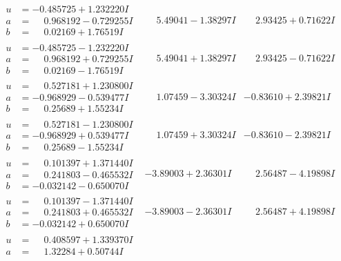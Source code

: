 \documentclass[1p]{elsarticle_modified}
\theoremstyle{definition}
\begin{document}
$$\begin{array}{c|c|c}
\begin{aligned}
u &= -0.485725 + 1.232220 I \\
a &= \phantom{-}0.968192 - 0.729255 I \\
b &= \phantom{-}0.02169 + 1.76519 I\end{aligned}
 & \phantom{-}5.49041 - 1.38297 I & \phantom{-}2.93425 + 0.71622 I \\ \hline\begin{aligned}
u &= -0.485725 - 1.232220 I \\
a &= \phantom{-}0.968192 + 0.729255 I \\
b &= \phantom{-}0.02169 - 1.76519 I\end{aligned}
 & \phantom{-}5.49041 + 1.38297 I & \phantom{-}2.93425 - 0.71622 I \\ \hline\begin{aligned}
u &= \phantom{-}0.527181 + 1.230800 I \\
a &= -0.968929 - 0.539477 I \\
b &= \phantom{-}0.25689 + 1.55234 I\end{aligned}
 & \phantom{-}1.07459 - 3.30324 I & -0.83610 + 2.39821 I \\ \hline\begin{aligned}
u &= \phantom{-}0.527181 - 1.230800 I \\
a &= -0.968929 + 0.539477 I \\
b &= \phantom{-}0.25689 - 1.55234 I\end{aligned}
 & \phantom{-}1.07459 + 3.30324 I & -0.83610 - 2.39821 I \\ \hline\begin{aligned}
u &= \phantom{-}0.101397 + 1.371440 I \\
a &= \phantom{-}0.241803 - 0.465532 I \\
b &= -0.032142 - 0.650070 I\end{aligned}
 & -3.89003 + 2.36301 I & \phantom{-}2.56487 - 4.19898 I \\ \hline\begin{aligned}
u &= \phantom{-}0.101397 - 1.371440 I \\
a &= \phantom{-}0.241803 + 0.465532 I \\
b &= -0.032142 + 0.650070 I\end{aligned}
 & -3.89003 - 2.36301 I & \phantom{-}2.56487 + 4.19898 I \\ \hline\begin{aligned}
u &= \phantom{-}0.408597 + 1.339370 I \\
a &= \phantom{-}1.32284 + 0.50744 I \\

\end{aligned}
\end{array}$$
\end{document}
